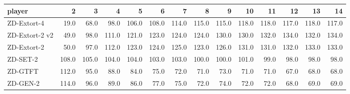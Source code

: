 \begin{tabular}{lrrrrrrrrrrrrr}
\toprule
         player &      2 &      3 &      4 &      5 &      6 &      7 &      8 &      9 &     10 &     11 &     12 &     13 &     14 \\
\midrule
    ZD-Extort-4 &   19.0 &   68.0 &   98.0 &  106.0 &  108.0 &  114.0 &  115.0 &  115.0 &  118.0 &  118.0 &  117.0 &  118.0 &  117.0 \\
 ZD-Extort-2 v2 &   49.0 &   98.0 &  111.0 &  121.0 &  123.0 &  124.0 &  124.0 &  130.0 &  130.0 &  132.0 &  134.0 &  132.0 &  134.0 \\
    ZD-Extort-2 &   50.0 &   97.0 &  112.0 &  123.0 &  124.0 &  125.0 &  123.0 &  126.0 &  131.0 &  131.0 &  132.0 &  133.0 &  133.0 \\
       ZD-SET-2 &  108.0 &  105.0 &  104.0 &  104.0 &  103.0 &  103.0 &  100.0 &  100.0 &  101.0 &   99.0 &   98.0 &   98.0 &   98.0 \\
        ZD-GTFT &  112.0 &   95.0 &   88.0 &   84.0 &   75.0 &   72.0 &   71.0 &   73.0 &   71.0 &   71.0 &   67.0 &   68.0 &   68.0 \\
       ZD-GEN-2 &  114.0 &   96.0 &   89.0 &   86.0 &   77.0 &   75.0 &   72.0 &   74.0 &   72.0 &   72.0 &   68.0 &   69.0 &   69.0 \\
\bottomrule
\end{tabular}
